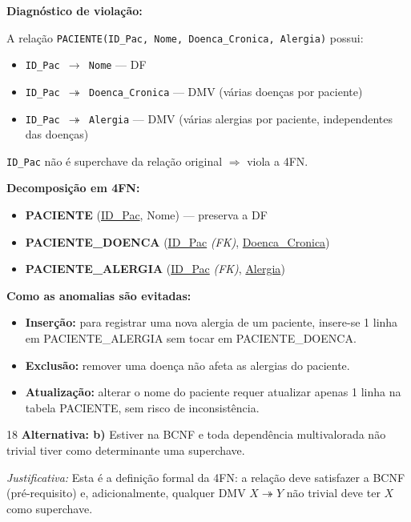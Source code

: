 \documentclass[12pt]{article}
\begin{document}
\begin{respdisc}
\textbf{Diagnóstico de violação:}

A relação \texttt{PACIENTE(ID\_Pac, Nome, Doenca\_Cronica, Alergia)} possui:
\begin{itemize}
  \item \texttt{ID\_Pac $\to$ Nome} — DF
  \item \texttt{ID\_Pac $\twoheadrightarrow$ Doenca\_Cronica} — DMV (várias doenças por paciente)
  \item \texttt{ID\_Pac $\twoheadrightarrow$ Alergia} — DMV (várias alergias por paciente, independentes das doenças)
\end{itemize}

\texttt{ID\_Pac} não é superchave da relação original $\Rightarrow$ viola a 4FN.

\medskip
\textbf{Decomposição em 4FN:}

\begin{itemize}
  \item \textbf{PACIENTE} (\underline{ID\_Pac}, Nome) \quad — preserva a DF
  \item \textbf{PACIENTE\_DOENCA} (\underline{ID\_Pac} \textit{(FK)}, \underline{Doenca\_Cronica})
  \item \textbf{PACIENTE\_ALERGIA} (\underline{ID\_Pac} \textit{(FK)}, \underline{Alergia})
\end{itemize}

\medskip
\textbf{Como as anomalias são evitadas:}
\begin{itemize}
  \item \textbf{Inserção:} para registrar uma nova alergia de um paciente, insere-se 1 linha em PACIENTE\_ALERGIA sem tocar em PACIENTE\_DOENCA.
  \item \textbf{Exclusão:} remover uma doença não afeta as alergias do paciente.
  \item \textbf{Atualização:} alterar o nome do paciente requer atualizar apenas 1 linha na tabela PACIENTE, sem risco de inconsistência.
\end{itemize}
\end{respdisc}

\vspace{0.5cm}

\begin{gabbox}{18}
\textbf{Alternativa: b)} Estiver na BCNF e toda dependência multivalorada não trivial tiver como determinante uma superchave.

\smallskip
\textit{Justificativa:} Esta é a definição formal da 4FN: a relação deve satisfazer a BCNF (pré-requisito) e, adicionalmente, qualquer DMV $X \twoheadrightarrow Y$ não trivial deve ter $X$ como superchave.
\end{gabbox}
\end{document}
